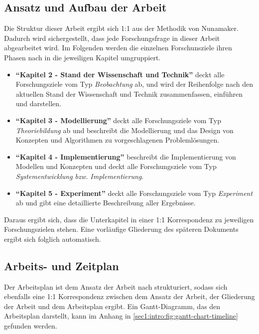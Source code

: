 \subsection{Ansatz und Aufbau der Arbeit}
\label{sec1:intro:subsec:appr-struct}
Die Struktur dieser Arbeit ergibt sich 1:1 aus der Methodik von Nunamaker. Dadurch wird sichergestellt, dass jede Forschungsfrage in dieser Arbeit abgearbeitet wird. Im Folgenden werden die einzelnen Forschunsziele ihren Phasen nach in die jeweiligen Kapitel umgruppiert.
\begin{itemize}
    \setlength{\itemsep}{0pt}
    \item \textbf{\enquote{Kapitel 2 - Stand der Wissenschaft und Technik}} deckt alle Forschungsziele vom Typ \textit{Beobachtung} ab, und wird der Reihenfolge nach den aktuellen Stand der Wissenschaft und Technik zusammenfassen, einführen und darstellen.
    \item \textbf{\enquote{Kapitel 3 - Modellierung}} deckt alle Forschungsziele vom Typ \textit{Theoriebildung} ab und beschreibt die Modellierung und das Design von Konzepten und Algorithmen zu vorgeschlagenen Problemlösungen.
    \item \textbf{\enquote{Kapitel 4 - Implementierung}} beschreibt die Implementierung von Modellen und Konzepten und deckt alle Forschungsziele vom Typ \textit{Systementwicklung bzw. Implementierung}.
    \item \textbf{\enquote{Kapitel 5 - Experiment}} deckt alle Forschungsziele vom Typ \textit{Experiment} ab und gibt eine detaillierte Beschreibung aller Ergebnisse.
\end{itemize}
Daraus ergibt sich, dass die Unterkapitel in einer 1:1 Korrespondenz zu jeweiligen Forschungszielen stehen. Eine vorläufige Gliederung des späteren Dokuments ergibt sich folglich automatisch.

\subsection{Arbeits- und Zeitplan}
\label{sec1:intro:subsec:work-time-plan}
Der Arbeitsplan ist dem Ansatz der Arbeit nach strukturiert, sodass sich ebenfalls eine 1:1 Korrespondenz zwischen dem Ansatz der Arbeit, der Gliederung der Arbeit und dem Arbeitsplan ergibt. Ein Gantt-Diagramm, das den Arbeitsplan darstellt, kann im Anhang in \cref{sec1:intro:fig:gantt-chart-timeline} gefunden werden.

%